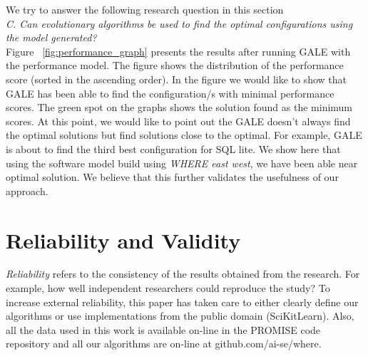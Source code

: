 \documentclass{sig-alternative}
\begin{document}
We try to answer the following research question in this section\\

\textit{C. Can evolutionary algorithms be used to find the optimal
configurations using the model generated?}
\\
Figure ~\ref{fig:performance_graph} presents the results after running GALE with the performance model. The figure shows the distribution of the performance score (sorted in the ascending order). In the figure we would like to show that GALE has been able to find the configuration/s with minimal performance scores. The green spot on the graphs shows the solution found as the minimum scores. At this point, we would like to point out the GALE doesn't always find the optimal solutions but find solutions close to the optimal. For example, GALE is about to find the third best configuration for SQL lite. We show here that using the software model build using \textit{WHERE east west}, we have been able near optimal solution. We believe that this further validates the usefulness of our approach.  


 
 
\section{Reliability and Validity}\label{sect:construct}


{\em Reliability} refers to the consistency of the results obtained
from the research.  For example,   how well independent researchers
could reproduce the study? To increase external
reliability, this paper has taken care to either  clearly define our
algorithms or use implementations from the public domain
(SciKitLearn). Also, all the data used in this work is available
on-line in the PROMISE code repository and all our algorithms
are on-line at github.com/ai-se/where.
\end{document}
